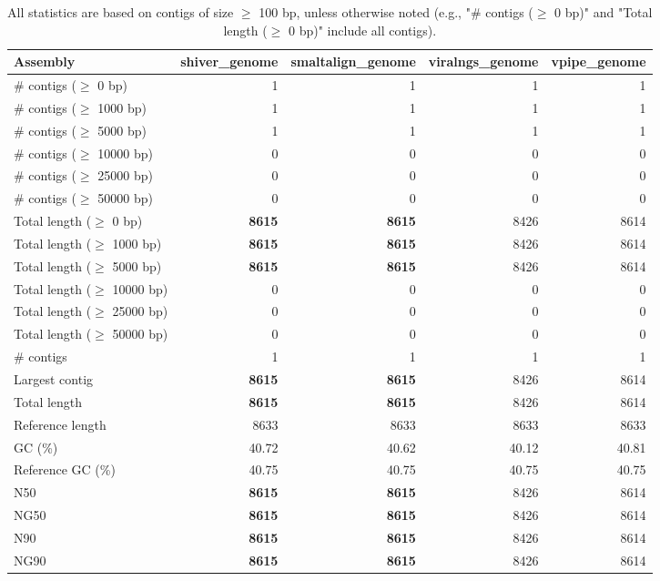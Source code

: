 \documentclass[12pt,a4paper]{article}
\begin{document}
\begin{table}[ht]
\begin{center}
\caption{All statistics are based on contigs of size $\geq$ 100 bp, unless otherwise noted (e.g., "\# contigs ($\geq$ 0 bp)" and "Total length ($\geq$ 0 bp)" include all contigs).}
\begin{tabular}{|l*{4}{|r}|}
\hline
Assembly & shiver\_genome & smaltalign\_genome & viralngs\_genome & vpipe\_genome \\ \hline
\# contigs ($\geq$ 0 bp) & 1 & 1 & 1 & 1 \\ \hline
\# contigs ($\geq$ 1000 bp) & 1 & 1 & 1 & 1 \\ \hline
\# contigs ($\geq$ 5000 bp) & 1 & 1 & 1 & 1 \\ \hline
\# contigs ($\geq$ 10000 bp) & 0 & 0 & 0 & 0 \\ \hline
\# contigs ($\geq$ 25000 bp) & 0 & 0 & 0 & 0 \\ \hline
\# contigs ($\geq$ 50000 bp) & 0 & 0 & 0 & 0 \\ \hline
Total length ($\geq$ 0 bp) & {\bf 8615} & {\bf 8615} & 8426 & 8614 \\ \hline
Total length ($\geq$ 1000 bp) & {\bf 8615} & {\bf 8615} & 8426 & 8614 \\ \hline
Total length ($\geq$ 5000 bp) & {\bf 8615} & {\bf 8615} & 8426 & 8614 \\ \hline
Total length ($\geq$ 10000 bp) & 0 & 0 & 0 & 0 \\ \hline
Total length ($\geq$ 25000 bp) & 0 & 0 & 0 & 0 \\ \hline
Total length ($\geq$ 50000 bp) & 0 & 0 & 0 & 0 \\ \hline
\# contigs & 1 & 1 & 1 & 1 \\ \hline
Largest contig & {\bf 8615} & {\bf 8615} & 8426 & 8614 \\ \hline
Total length & {\bf 8615} & {\bf 8615} & 8426 & 8614 \\ \hline
Reference length & 8633 & 8633 & 8633 & 8633 \\ \hline
GC (\%) & 40.72 & 40.62 & 40.12 & 40.81 \\ \hline
Reference GC (\%) & 40.75 & 40.75 & 40.75 & 40.75 \\ \hline
N50 & {\bf 8615} & {\bf 8615} & 8426 & 8614 \\ \hline
NG50 & {\bf 8615} & {\bf 8615} & 8426 & 8614 \\ \hline
N90 & {\bf 8615} & {\bf 8615} & 8426 & 8614 \\ \hline
NG90 & {\bf 8615} & {\bf 8615} & 8426 & 8614 \\ \hline

\end{tabular}
\end{center}
\end{table}
\end{document}
